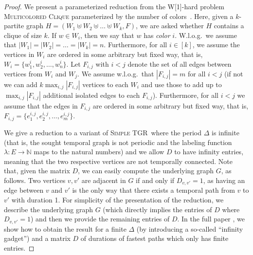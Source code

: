 \documentclass[a4paper,UKenglish,cleveref, autoref, thm-restate]{lipics-v2021}
\newcommand{\deltaExact}{\textsc{Simple TGR}}
\begin{document}
\begin{proof}
    We present a parameterized reduction from the W[1]-hard problem \textsc{Multicolored Clique} parameterized by the number of colors~\cite{fellows2009multipleinterval}.  Here, given a $k$-partite graph $H=(W_1\uplus W_2 \uplus\ldots\uplus W_k, F)$, we are asked whether $H$ contains a clique of size $k$. If $w\in W_i$, then we say that $w$ has \emph{color} $i$. W.l.o.g.\ we assume that $|W_1|=|W_2|=\ldots=|W_k|=n$. 
    Furthermore, for all $i\in[k]$, we assume the vertices in $W_i$ are ordered in some arbitrary but fixed way, that is, $W_i=\{w^i_1,w^i_2,\ldots,w^i_n\}$.
    Let $F_{i,j}$ with $i<j$ denote the set of all edges between vertices from $W_i$ and $W_j$. We assume w.l.o.g.\ that $|F_{i,j}|=m$ for all $i< j$ (if not we can add $k \max_{i,j}|F_{i,j}|$ vertices to each $W_i$ and use those to add up to $\max_{i,j}|F_{i,j}|$ additional isolated edges to each $F_{i,j}$).
    Furthermore, for all $i<j$ we assume that the edges in $F_{i,j}$ are ordered in some arbitrary but fixed way, that is, $F_{i,j}=\{e^{i,j}_1,e^{i,j}_2,\ldots,e^{i,j}_m\}$.

We give a reduction to a variant of \deltaExact\ where the period $\Delta$ is infinite (that is, the sought temporal graph is not periodic and the labeling function $\lambda : E\rightarrow \mathbb{N}$ maps to the natural numbers) and we allow $D$ to have infinity entries, meaning that the two respective vertices are not temporally connected. 
Note that, given the matrix $D$, we can easily compute the underlying graph $G$, as follows. Two vertices $v,v'$ are adjacent in $G$ if and only if $D_{v,v'}=1$, as having an edge between $v$ and $v'$ is the only way that there exists a temporal path from $v$ to $v'$ with duration 1. 
For simplicity of the presentation of the reduction, we describe the underlying graph $G$ (which directly implies the entries of $D$ where $D_{v,v'}=1$) and then we provide the remaining entries of $D$. 
In the full paper \cite{fullPaper}, we show how to obtain the result for a finite $\Delta$ (by introducing a so-called ``infinity gadget'') and a matrix $D$ of durations of fastest paths which only has finite entries. 


\end{proof}
\end{document}
